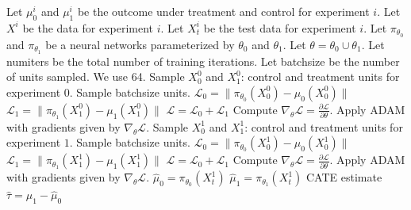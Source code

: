 \begin{algorithm}[H]
\caption{Warm Start T-learner}
\label{alg:warm-t}
\begin{algorithmic}[1]
\STATE Let $\mu^{i}_0$ and $\mu^{i}_1$ be the outcome under treatment and control for experiment $i$. 
\STATE Let $X^i$ be the data for experiment $i$. Let $X^i_t$ be the test data for experiment $i$. 
\STATE Let $\pi_{\theta_0}$ and $\pi_{\theta_1}$ be a neural networks parameterized by $\theta_0$ and $\theta_1$. 
\STATE Let $\theta = \theta_0 \cup \theta_1$. 
\STATE Let numiters be the total number of training iterations.
\STATE Let batchsize be the number of units sampled. We use 64. 
\STATE Sample $X^0_0$ and $X^0_1$: control and treatment units for experiment $0$. Sample batchsize units.  
\STATE $\mathcal{L}_0= \| \pi_{\theta_0} (X^0_0) - \mu_0(X^0_0) \| $
\STATE $\mathcal{L}_1 = \| \pi_{\theta_1} (X^0_1) - \mu_1(X^0_1) \| $
\STATE $\mathcal{L} = \mathcal{L}_0 + \mathcal{L}_1$
\STATE Compute $\nabla_{\theta} \mathcal{L} = \frac{\partial \mathcal{L}}{\partial \theta}$.
\STATE Apply ADAM with gradients given by $\nabla_{\theta} \mathcal{L}$. 
\ENDFOR
{}
\STATE Sample $X^1_0$ and $X^1_1$: control and treatment units for experiment $1$. Sample batchsize units.  
\STATE $\mathcal{L}_0= \| \pi_{\theta_0} (X^1_0) - \mu_0(X^1_0) \| $
\STATE $\mathcal{L}_1 = \| \pi_{\theta_1} (X^1_1) - \mu_1(X^1_1) \| $
\STATE $\mathcal{L} = \mathcal{L}_0 + \mathcal{L}_1$
\STATE Compute $\nabla_{\theta} \mathcal{L} = \frac{\partial \mathcal{L}}{\partial \theta}$.
\STATE Apply ADAM with gradients given by $\nabla_{\theta} \mathcal{L}$. 
\ENDFOR
\STATE $\hat{\mu}_0 = \pi_{\theta_0} (X^1_t)$
\STATE $\hat{\mu}_1 = \pi_{\theta_1} (X^1_t)$
 CATE estimate $\hat{\tau} = \hat{\mu}_1 - \hat{\mu}_0$
\end{algorithmic}
\end{algorithm}

\newpage

